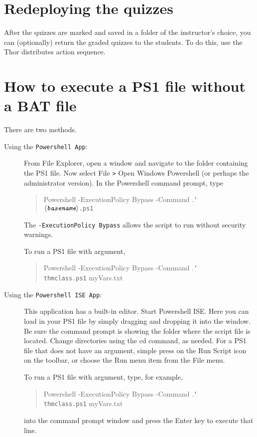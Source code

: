 \documentclass{article}
\def\cs#1{\texttt{\char`\\#1}}
\let\app\textsf
\let\uif\textsf
\def\ameta#1{\ensuremath{\langle\textit{\texttt{#1}}\rangle}}
\begin{document}
\section{Redeploying the quizzes}

After the quizzes are marked and saved in a folder of the instructor's
choice, you can (optionally) return the graded quizzes to the students. To do
this, use the  \textsf{Thor distributes} action sequence.

\section{How to execute a PS1 file without a BAT file} There are two methods.
\begin{description}
    \item [\normalfont Using the \texttt{\app{Powershell} App}:] From
        \uif{File Explorer}, open a window and navigate to the
        folder containing the PS1 file. Now select \uif{File}
        \texttt{>} \uif{Open Windows Powershell} (or perhaps
        the administrator version). In the \app{Powershell} command prompt, type
\begin{quote}\ttfamily
Powershell -ExecutionPolicy Bypass -Command .\cs{\ameta{basename}.ps1}
\end{quote}
The \texttt{-ExecutionPolicy Bypass} allows the script to run
without security warnings.

To run a PS1 file with argument,
\begin{quote}\ttfamily
Powershell -ExecutionPolicy Bypass -Command .\cs{thmclass.ps1} myVars.txt
\end{quote}

\item [\normalfont Using the \texttt{\app{Powershell} ISE App}:] This
    application has a built-in editor. Start \app{Powershell}
    ISE. Here you can load in your PS1 file by simply dragging
    and dropping it into the window. Be sure the command
    prompt is showing the folder where the script file is
    located. Change directories using the \uif{cd} command, as
    needed. For a PS1 file that does not  have an argument,
    simple press on the \uif{Run Script} icon on the toolbar,
    or choose the \uif{Run} menu item from the \uif{File}
    menu.

    To run a PS1 file with argument, type, for example,
\begin{quote}\ttfamily
Powershell -ExecutionPolicy Bypass -Command .\cs{thmclass.ps1} myVars.txt
\end{quote}
into the command prompt window and press the \uif{Enter} key to execute that line.
\end{description}
\end{document}
